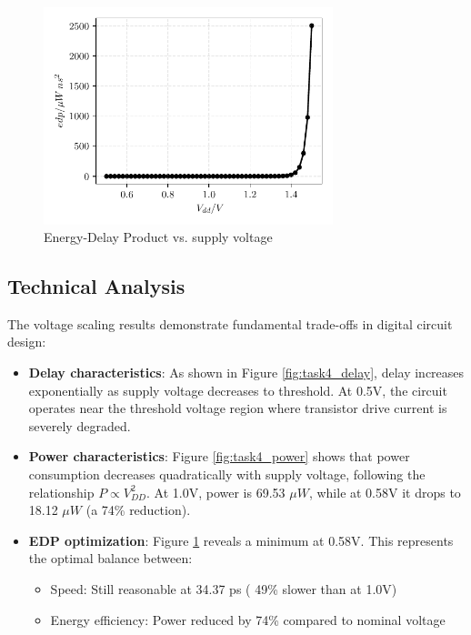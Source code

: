 \documentclass[UTF8,12pt,a4paper]{ctexart}
\begin{document}
\begin{figure}[h]
\centering
\includegraphics[width=0.75\textwidth]{Task4/edp_vs_volts.pdf}
\caption{Energy-Delay Product vs. supply voltage}
\label{fig:task4_edp}
\end{figure}

\subsection{Technical Analysis}

The voltage scaling results demonstrate fundamental trade-offs in digital circuit design:

\begin{itemize}
    \item[1.] \textbf{Delay characteristics}: As shown in Figure \ref{fig:task4_delay}, delay increases exponentially as supply voltage decreases to threshold. At 0.5V, the circuit operates near the threshold voltage region where transistor drive current is severely degraded.
    
    \item[2.] \textbf{Power characteristics}: Figure \ref{fig:task4_power} shows that power consumption decreases quadratically with supply voltage, following the relationship $P \propto V_{DD}^2$. At 1.0V, power is 69.53 $\mu W$, while at 0.58V it drops to 18.12 $\mu W$ (a 74\% reduction).
    
    \item[3.] \textbf{EDP optimization}: Figure \ref{fig:task4_edp} reveals a minimum at 0.58V. This represents the optimal balance between:
    \begin{itemize}
        \item Speed: Still reasonable at 34.37 ps ( 49\% slower than at 1.0V)
        \item Energy efficiency: Power reduced by 74\% compared to nominal voltage
    \end{itemize}
    
\end{itemize}
\end{document}
